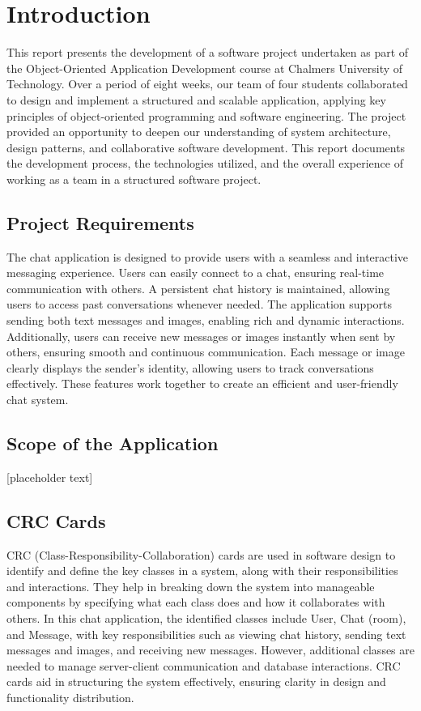 \section{Introduction}
This report presents the development of a software project undertaken as part
of the Object-Oriented Application Development course at Chalmers University of
Technology. Over a period of eight weeks, our team of four students
collaborated to design and implement a structured and scalable application,
applying key principles of object-oriented programming and software
engineering. The project provided an opportunity to deepen our understanding of
system architecture, design patterns, and collaborative software development.
This report documents the development process, the technologies utilized, and
the overall experience of working as a team in a structured software project.

\subsection{Project Requirements}
The chat application is designed to provide users with a seamless and
interactive messaging experience. Users can easily connect to a chat, ensuring
real-time communication with others. A persistent chat history is maintained,
allowing users to access past conversations whenever needed. The application
supports sending both text messages and images, enabling rich and dynamic
interactions. Additionally, users can receive new messages or images instantly
when sent by others, ensuring smooth and continuous communication. Each message
or image clearly displays the sender’s identity, allowing users to track
conversations effectively. These features work together to create an efficient
and user-friendly chat system.

\subsection{Scope of the Application}
[placeholder text]

\subsection{CRC Cards}
CRC (Class-Responsibility-Collaboration) cards are used in software design to
identify and define the key classes in a system, along with their
responsibilities and interactions. They help in breaking down the system into
manageable components by specifying what each class does and how it
collaborates with others. In this chat application, the identified classes
include User, Chat (room), and Message, with key responsibilities such as
viewing chat history, sending text messages and images, and receiving new
messages. However, additional classes are needed to manage server-client
communication and database interactions. CRC cards aid in structuring the
system effectively, ensuring clarity in design and functionality distribution.

